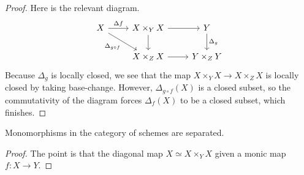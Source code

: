 \documentclass[../notes.tex]{subfiles}
\begin{document}
\begin{proof}
	Here is the relevant diagram.
	\[\begin{tikzcd}
		X & {X\times_YX} & Y \\
		& {X\times_ZX} & {Y\times_ZY}
		\arrow["{\Delta_g}", from=1-3, to=2-3]
		\arrow["{\Delta f}", from=1-1, to=1-2]
		\arrow["{\Delta_{g\circ f}}"', from=1-1, to=2-2]
		\arrow[from=2-2, to=2-3]
		\arrow[from=1-2, to=2-2]
		\arrow[from=1-2, to=1-3]
	\end{tikzcd}\]
	Because $\Delta_g$ is locally closed, we see that the map $X\times_YX\to X\times_ZX$ is locally closed by taking base-change. However, $\Delta_{g\circ f}(X)$ is a closed subset, so the commutativity of the diagram forces $\Delta_f(X)$ to be a closed subset, which finishes.
\end{proof}
\begin{lemma}
	Monomorphisms in the category of schemes are separated.
\end{lemma}
\begin{proof}
	The point is that the diagonal map $X\simeq X\times_YX$ given a monic map $f\colon X\to Y$.
\end{proof}
\end{document}
